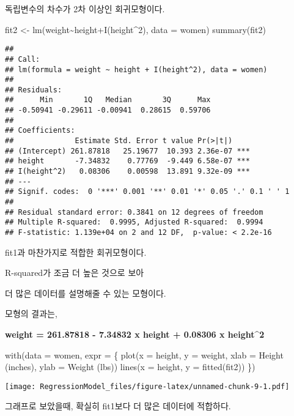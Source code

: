 \documentclass[
]{article}
\newenvironment{Shaded}{\begin{snugshade}}{\end{snugshade}}
\newcommand{\AttributeTok}[1]{\textcolor[rgb]{0.77,0.63,0.00}{#1}}
\newcommand{\DecValTok}[1]{\textcolor[rgb]{0.00,0.00,0.81}{#1}}
\newcommand{\FunctionTok}[1]{\textcolor[rgb]{0.00,0.00,0.00}{#1}}
\newcommand{\NormalTok}[1]{#1}
\newcommand{\OtherTok}[1]{\textcolor[rgb]{0.56,0.35,0.01}{#1}}
\newcommand{\SpecialCharTok}[1]{\textcolor[rgb]{0.00,0.00,0.00}{#1}}
\newcommand{\StringTok}[1]{\textcolor[rgb]{0.31,0.60,0.02}{#1}}
\begin{document}
독립변수의 차수가 2차 이상인 회귀모형이다.

\begin{Shaded}
\begin{Highlighting}[]
\NormalTok{fit2 }\OtherTok{\textless{}{-}} \FunctionTok{lm}\NormalTok{(weight}\SpecialCharTok{\textasciitilde{}}\NormalTok{height}\SpecialCharTok{+}\FunctionTok{I}\NormalTok{(height}\SpecialCharTok{\^{}}\DecValTok{2}\NormalTok{), }\AttributeTok{data =}\NormalTok{ women)}
\FunctionTok{summary}\NormalTok{(fit2)}
\end{Highlighting}
\end{Shaded}

\begin{verbatim}
## 
## Call:
## lm(formula = weight ~ height + I(height^2), data = women)
## 
## Residuals:
##      Min       1Q   Median       3Q      Max 
## -0.50941 -0.29611 -0.00941  0.28615  0.59706 
## 
## Coefficients:
##              Estimate Std. Error t value Pr(>|t|)    
## (Intercept) 261.87818   25.19677  10.393 2.36e-07 ***
## height       -7.34832    0.77769  -9.449 6.58e-07 ***
## I(height^2)   0.08306    0.00598  13.891 9.32e-09 ***
## ---
## Signif. codes:  0 '***' 0.001 '**' 0.01 '*' 0.05 '.' 0.1 ' ' 1
## 
## Residual standard error: 0.3841 on 12 degrees of freedom
## Multiple R-squared:  0.9995, Adjusted R-squared:  0.9994 
## F-statistic: 1.139e+04 on 2 and 12 DF,  p-value: < 2.2e-16
\end{verbatim}

fit1과 마찬가지로 적합한 회귀모형이다.

R-squared가 조금 더 높은 것으로 보아

더 많은 데이터를 설명해줄 수 있는 모형이다.

모형의 결과는,

\textbf{weight = 261.87818 - 7.34832 x height + 0.08306 x height\^{}2}

\begin{Shaded}
\begin{Highlighting}[]
\FunctionTok{with}\NormalTok{(}\AttributeTok{data =}\NormalTok{ women, }\AttributeTok{expr =}\NormalTok{ \{}
  \FunctionTok{plot}\NormalTok{(}\AttributeTok{x =}\NormalTok{ height, }\AttributeTok{y =}\NormalTok{ weight, }\AttributeTok{xlab =} \StringTok{\textquotesingle{}Height (inches)\textquotesingle{}}\NormalTok{, }\AttributeTok{ylab =} \StringTok{\textquotesingle{}Weight (lbs)\textquotesingle{}}\NormalTok{)}
  \FunctionTok{lines}\NormalTok{(}\AttributeTok{x =}\NormalTok{ height, }\AttributeTok{y =} \FunctionTok{fitted}\NormalTok{(fit2))}
\NormalTok{\})}
\end{Highlighting}
\end{Shaded}

\texttt{[image: RegressionModel\_files/figure-latex/unnamed-chunk-9-1.pdf]}

그래프로 보았을때, 확실히 fit1보다 더 많은 데이터에 적합하다.
\end{document}
